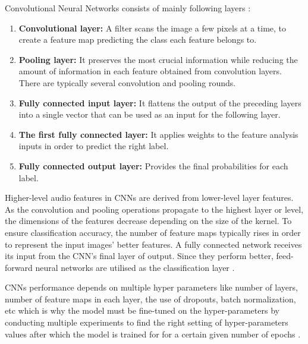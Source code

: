Convolutional Neural Networks consists of mainly following layers \cite{fukushima_neocognitron_1988}:
\begin{enumerate}
    \item \textbf{Convolutional layer:} A filter scans the image a few pixels at a time, to create a feature map predicting the class each feature belongs to. %
    \item \textbf{Pooling layer:} It preserves the most crucial information while reducing the amount of information in each feature obtained from convolution layers. There are typically several convolution and pooling rounds.
    \item \textbf{Fully connected input layer:} It flattens the output of the preceding layers into a single vector that can be used as an input for the following layer.
    \item \textbf{The first fully connected layer:} It applies weights to the feature analysis inputs in order to predict the right label.
    \item \textbf{Fully connected output layer:} Provides the final probabilities for each label.
\end{enumerate}

Higher-level audio features in CNNs are derived from lower-level layer features. As the convolution and pooling operations propagate to the highest layer or level, the dimensions of the features decrease depending on the size of the kernel. To ensure classification accuracy, the number of feature maps typically rises in order to represent the input images' better features. A fully connected network receives its input from the CNN's final layer of output. Since they perform better, feed-forward neural networks are utilised as the classification layer \cite{abdel-hamid_exploring_2013}.

CNNs performance depends on multiple hyper parameters like number of layers, number of feature maps in each layer, the use of dropouts, batch normalization, etc which is why the model must be fine-tuned on the hyper-parameters by conducting multiple experiments to find the right setting of hyper-parameters values after which the model is trained for for a certain given number of epochs \cite{backstrom_introduction_2022}.

